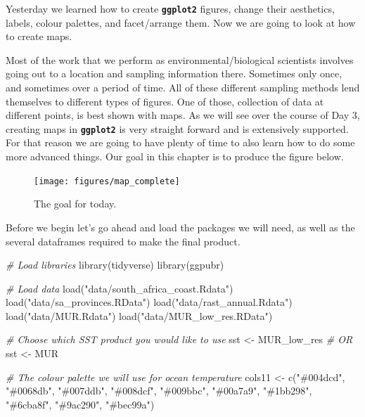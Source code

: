 \documentclass[
]{book}
\newenvironment{Shaded}{\begin{snugshade}}{\end{snugshade}}
\newcommand{\CommentTok}[1]{\textcolor[rgb]{0.56,0.35,0.01}{\textit{#1}}}
\newcommand{\FunctionTok}[1]{\textcolor[rgb]{0.00,0.00,0.00}{#1}}
\newcommand{\NormalTok}[1]{#1}
\newcommand{\OtherTok}[1]{\textcolor[rgb]{0.56,0.35,0.01}{#1}}
\newcommand{\StringTok}[1]{\textcolor[rgb]{0.31,0.60,0.02}{#1}}
\begin{document}
Yesterday we learned how to create \textbf{\texttt{ggplot2}} figures, change their aesthetics, labels, colour palettes, and facet/arrange them. Now we are going to look at how to create maps.

Most of the work that we perform as environmental/biological scientists involves going out to a location and sampling information there. Sometimes only once, and sometimes over a period of time. All of these different sampling methods lend themselves to different types of figures. One of those, collection of data at different points, is best shown with maps. As we will see over the course of Day 3, creating maps in \textbf{\texttt{ggplot2}} is very straight forward and is extensively supported. For that reason we are going to have plenty of time to also learn how to do some more advanced things. Our goal in this chapter is to produce the figure below.

\begin{figure}

{\centering \texttt{[image: figures/map\_complete]} 

}

\caption{The goal for today.}\label{fig:map-goal}
\end{figure}

Before we begin let's go ahead and load the packages we will need, as well as the several dataframes required to make the final product.

\begin{Shaded}
\begin{Highlighting}[]
\CommentTok{\# Load libraries}
\FunctionTok{library}\NormalTok{(tidyverse)}
\FunctionTok{library}\NormalTok{(ggpubr)}

\CommentTok{\# Load data}
\FunctionTok{load}\NormalTok{(}\StringTok{"data/south\_africa\_coast.Rdata"}\NormalTok{)}
\FunctionTok{load}\NormalTok{(}\StringTok{"data/sa\_provinces.RData"}\NormalTok{)}
\FunctionTok{load}\NormalTok{(}\StringTok{"data/rast\_annual.Rdata"}\NormalTok{)}
\FunctionTok{load}\NormalTok{(}\StringTok{"data/MUR.Rdata"}\NormalTok{)}
\FunctionTok{load}\NormalTok{(}\StringTok{"data/MUR\_low\_res.RData"}\NormalTok{)}

\CommentTok{\# Choose which SST product you would like to use}
\NormalTok{sst }\OtherTok{\textless{}{-}}\NormalTok{ MUR\_low\_res}
\CommentTok{\# OR}
\NormalTok{sst }\OtherTok{\textless{}{-}}\NormalTok{ MUR}

\CommentTok{\# The colour palette we will use for ocean temperature}
\NormalTok{cols11 }\OtherTok{\textless{}{-}} \FunctionTok{c}\NormalTok{(}\StringTok{"\#004dcd"}\NormalTok{, }\StringTok{"\#0068db"}\NormalTok{, }\StringTok{"\#007ddb"}\NormalTok{, }\StringTok{"\#008dcf"}\NormalTok{, }\StringTok{"\#009bbc"}\NormalTok{,}
            \StringTok{"\#00a7a9"}\NormalTok{, }\StringTok{"\#1bb298"}\NormalTok{, }\StringTok{"\#6cba8f"}\NormalTok{, }\StringTok{"\#9ac290"}\NormalTok{, }\StringTok{"\#bec99a"}\NormalTok{)}
\end{Highlighting}
\end{Shaded}
\end{document}
